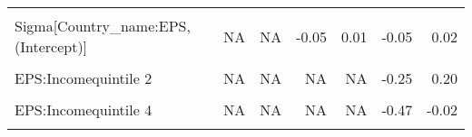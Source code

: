 \begin{table}
\begin{tabular}[t]{lrrrrrr}
\cellcolor{gray!10}{b[EPS Country\_name:US]} & \cellcolor{gray!10}{NA} & \cellcolor{gray!10}{NA} & \cellcolor{gray!10}{-0.23} & \cellcolor{gray!10}{0.11} & \cellcolor{gray!10}{-0.21} & \cellcolor{gray!10}{0.10}\\
Sigma[Country\_name:EPS,(Intercept)] & NA & NA & -0.05 & 0.01 & -0.05 & 0.02\\
\cellcolor{gray!10}{Sigma[Country\_name:EPS,EPS]} & \cellcolor{gray!10}{NA} & \cellcolor{gray!10}{NA} & \cellcolor{gray!10}{0.00} & \cellcolor{gray!10}{0.07} & \cellcolor{gray!10}{0.00} & \cellcolor{gray!10}{0.06}\\
EPS:Incomequintile 2 & NA & NA & NA & NA & -0.25 & 0.20\\
\cellcolor{gray!10}{EPS:Incomequintile 3} & \cellcolor{gray!10}{NA} & \cellcolor{gray!10}{NA} & \cellcolor{gray!10}{NA} & \cellcolor{gray!10}{NA} & \cellcolor{gray!10}{-0.47} & \cellcolor{gray!10}{-0.02}\\
EPS:Incomequintile 4 & NA & NA & NA & NA & -0.47 & -0.02\\
\cellcolor{gray!10}{EPS:Incomequintile 5} & \cellcolor{gray!10}{NA} & \cellcolor{gray!10}{NA} & \cellcolor{gray!10}{NA} & \cellcolor{gray!10}{NA} & \cellcolor{gray!10}{-0.45} & \cellcolor{gray!10}{0.00}\\
\bottomrule
\end{tabular}
\end{table}
